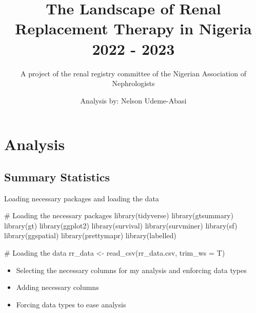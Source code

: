 \documentclass[
  letterpaper,
  DIV=11,
  numbers=noendperiod]{scrartcl}
\title{The Landscape of Renal Replacement Therapy in Nigeria \textbar{}
2022 - 2023}
\subtitle{A project of the renal registry committee of the Nigerian
Association of Nephrologists}
\author{Analysis by: Nelson Udeme-Abasi}
\date{}
\newenvironment{Shaded}{\begin{snugshade}}{\end{snugshade}}
\newcommand{\AttributeTok}[1]{\textcolor[rgb]{0.40,0.45,0.13}{#1}}
\newcommand{\CommentTok}[1]{\textcolor[rgb]{0.37,0.37,0.37}{#1}}
\newcommand{\FunctionTok}[1]{\textcolor[rgb]{0.28,0.35,0.67}{#1}}
\newcommand{\NormalTok}[1]{\textcolor[rgb]{0.00,0.23,0.31}{#1}}
\newcommand{\OtherTok}[1]{\textcolor[rgb]{0.00,0.23,0.31}{#1}}
\newcommand{\StringTok}[1]{\textcolor[rgb]{0.13,0.47,0.30}{#1}}
\begin{document}
\maketitle


\section{Analysis}\label{analysis}

\subsection{Summary Statistics}\label{summary-statistics}

Loading necessary packages and loading the data

\begin{Shaded}
\begin{Highlighting}[]
\CommentTok{\# Loading the necessary packages}
\FunctionTok{library}\NormalTok{(tidyverse)}
\FunctionTok{library}\NormalTok{(gtsummary)}
\FunctionTok{library}\NormalTok{(gt)}
\FunctionTok{library}\NormalTok{(ggplot2)}
\FunctionTok{library}\NormalTok{(survival)}
\FunctionTok{library}\NormalTok{(survminer)}
\FunctionTok{library}\NormalTok{(sf)}
\FunctionTok{library}\NormalTok{(ggspatial)}
\FunctionTok{library}\NormalTok{(prettymapr)}
\FunctionTok{library}\NormalTok{(labelled)}

\CommentTok{\# Loading the data}
\NormalTok{rr\_data }\OtherTok{\textless{}{-}} \FunctionTok{read\_csv}\NormalTok{(}\StringTok{\textquotesingle{}rr\_data.csv\textquotesingle{}}\NormalTok{, }\AttributeTok{trim\_ws =}\NormalTok{ T)}
\end{Highlighting}
\end{Shaded}

\begin{itemize}
\item
  Selecting the necessary columns for my analysis and enforcing data
  types
\item
  Adding necessary columns
\item
  Forcing data types to ease analysis
\end{itemize}
\end{document}
